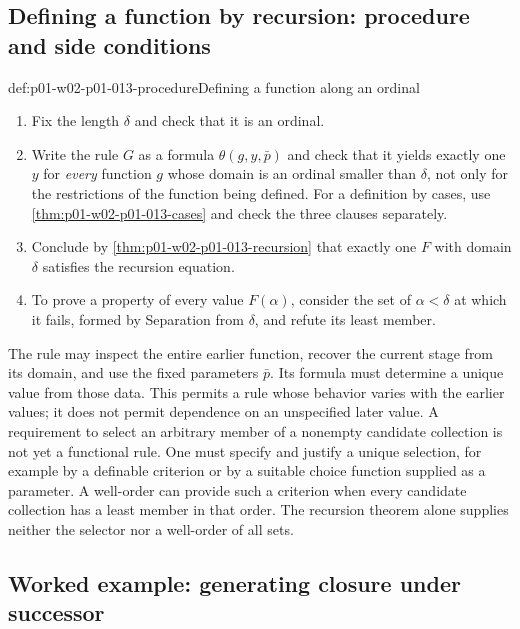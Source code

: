 \subsection{Defining a function by recursion: procedure and side conditions}
\label{sec:p01-w02-p01-013-procedure}

\begin{hbmethod}{def:p01-w02-p01-013-procedure}{Defining a function along an ordinal}
\begin{enumerate}
  \item Fix the length \(\delta\) and check that it is an ordinal.
  \item Write the rule \(G\) as a formula \(\theta(g,y,\bar p)\) and check
        that it yields exactly one \(y\) for \emph{every} function \(g\)
        whose domain is an ordinal smaller than \(\delta\), not only for the
        restrictions of the function being defined. For a definition by
        cases, use \cref{thm:p01-w02-p01-013-cases} and check the three
        clauses separately.
  \item Conclude by \cref{thm:p01-w02-p01-013-recursion} that exactly one
        \(F\) with domain \(\delta\) satisfies the recursion equation.
  \item To prove a property of every value \(F(\alpha)\), consider the set
        of \(\alpha<\delta\) at which it fails, formed by Separation from
        \(\delta\), and refute its least member.
\end{enumerate}
The rule may inspect the entire earlier function, recover the current
stage from its domain, and use the fixed parameters \(\bar p\). Its formula
must determine a unique value from those data. This permits a rule whose
behavior varies with the earlier values; it does not permit dependence on
an unspecified later value. A requirement to select an arbitrary member of
a nonempty candidate collection is not yet a functional rule. One must
specify and justify a unique selection, for example by a definable
criterion or by a suitable choice function supplied as a parameter.
A well-order can provide such a criterion when every candidate collection
has a least member in that order. The recursion theorem alone supplies
neither the selector nor a well-order of all sets.
\end{hbmethod}

\subsection{Worked example: generating closure under successor}
\label{sec:p01-w02-p01-013-example}

